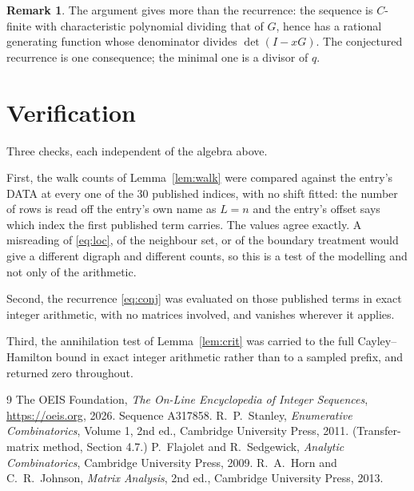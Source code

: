 \documentclass[11pt,a4paper]{article}
\theoremstyle{plain}
\theoremstyle{definition}
\newtheorem{remark}[theorem]{Remark}
\begin{document}
\begin{remark}
The argument gives more than the recurrence: the sequence is $C$-finite with characteristic
polynomial dividing that of $G$, hence has a rational generating function whose denominator
divides $\det(I-xG)$. The conjectured recurrence is one consequence; the minimal one is a
divisor of $q$.
\end{remark}

\section{Verification}

Three checks, each independent of the algebra above.

First, the walk counts of Lemma~\ref{lem:walk} were compared against the entry's DATA at
every one of the $30$ published indices, with no shift fitted: the number of rows is
read off the entry's own name as $L=n$ and the entry's offset says which index the first
published term carries. The values agree exactly. A misreading of \eqref{eq:loc}, of the
neighbour set, or of the boundary treatment would give a different digraph and different
counts, so this is a test of the modelling and not only of the arithmetic.

Second, the recurrence \eqref{eq:conj} was evaluated on those published terms in exact
integer arithmetic, with no matrices involved, and vanishes wherever it applies.

Third, the annihilation test of Lemma~\ref{lem:crit} was carried to the full
Cayley--Hamilton bound in exact integer arithmetic rather than to a sampled prefix, and
returned zero throughout.

\begin{thebibliography}{9}
 The OEIS Foundation, \emph{The On-Line Encyclopedia of Integer
Sequences}, \url{https://oeis.org}, 2026. Sequence A317858.
 R.~P.~Stanley, \emph{Enumerative Combinatorics}, Volume 1, 2nd ed.,
Cambridge University Press, 2011. (Transfer-matrix method, Section 4.7.)
 P.~Flajolet and R.~Sedgewick, \emph{Analytic Combinatorics}, Cambridge
University Press, 2009.
 R.~A.~Horn and C.~R.~Johnson, \emph{Matrix Analysis}, 2nd ed., Cambridge
University Press, 2013.
\end{thebibliography}
\end{document}
